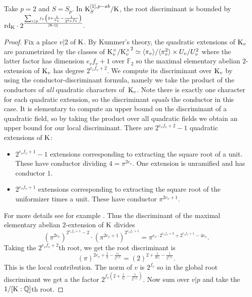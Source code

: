 \documentclass[12pt,a4paper,twoside,english]{smfart}
\def\Q{{\mathbb Q}}
\def\K{{\rm K}}
\def\rd{{\rm rd}}
\begin{document}
\begin{theo}\label{prop:boundat2} Take $p=2$ and $S=S_p$.
In $\K_S^{[1],p-ab}/\K$, the root discriminant is bounded by 
$ \rd_\K  \cdot  2^{   \frac{\sum_{v|p}{f_v} \left( 2+\frac1{e_v}-\frac{1}{2^{e_vf_v}} \right)  }{[\K:\Q]}     }.$
\end{theo}
\begin{proof} 
Fix a place $v|2$ of $\K$. 
By Kummer's theory, the quadratic extensions of $\K_v$ are parametrized by the classes of 
$\K^\times_v/{\K^\times_v}^2 \simeq \langle  \pi_v \rangle/ \langle \pi_v^2 \rangle \times U_v/U^2_v$ where the latter factor has dimension
$e_vf_v+1$ over $\mathbb F_2$ so the maximal elementary abelian $2$-extension of $\K_v$ has degree $2^{e_vf_v+2}$. We compute its discriminant
over $\K_v$ by using the conductor-discriminant formula, namely we take the product of the conductors of {\it all} quadratic characters
of~$\K_v$.  Note there is exactly one character for each quadratic extension, so the discriminant {\it equals} the conductor in this case.
It is elementary to compute an upper bound on the discriminant of a quadratic field, so by taking the product over all quadratic fields we obtain an
upper bound for our local  discriminant.
There are $2^{e_vf_v+2}-1$ quadratic extensions of $\K$: 
\begin{itemize}
\item[$\bullet$]  $2^{e_vf_v+1}- 1$ extensions corresponding to extracting the square root of a unit.  These have conductor  dividing  $4=\pi^{2e_v}$. One extension  is unramified 
        and has conductor $1$. 
\item[$\bullet$] $2^{e_vf_v+1}$ extensions corresponding to extracting the square root of the uniformizer times a unit. These have conductor $\pi^{2e_v +1}$.
\end{itemize}
For more details see for example \cite[Chapter II, Proposition 1.6.3]{gras}.
Thus the discriminant of the maximal elementary abelian $2$-extension of $\K$ divides
$$(\pi^{2e_v})^{2^{e_vf_v+1}-2} \cdot (\pi^{2e_v+1})^{2^{e_vf_v+1}} = \pi^{e_v\cdot2^{e_vf_v+3} +2^{e_vf_v+1}-4e_v}.$$
Taking the $2^{e_vf_v+2}$th root, we get the root discriminant is
$$(\pi)^{2e_v+\frac12-\frac{e_v}{2^{e_vf_v}}} =(2)^{2+\frac1{2e_v} -\frac1{2^{e_vf_v}}}.$$
This is the local contribution. The norm of $v$ is $2^{f_v}$ so in the global root discriminant we get a the factor
$2^{f_v \left( 2+\frac1{e_v}-\frac{1}{2^{e_vf_v}} \right)   }$. Now sum over $v|p$ and take the $1/[\K:\Q]$th root.
\end{proof}
\end{document}
